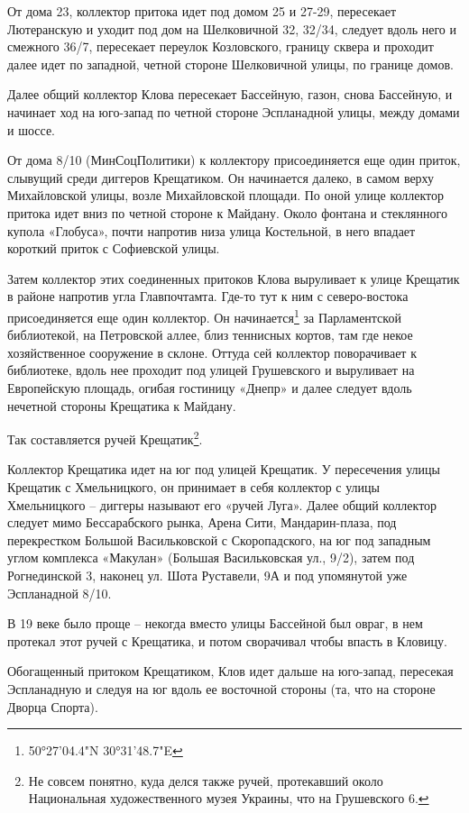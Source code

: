 От дома 23, коллектор притока идет под домом 25 и 27-29, пересекает Лютеранскую и уходит под дом на Шелковичной 32, 32/34, следует вдоль него и смежного 36/7, пересекает переулок Козловского, границу сквера и проходит далее идет по западной, четной стороне Шелковичной улицы, по границе домов.

Далее общий коллектор Клова пересекает Бассейную, газон, снова Бассейную, и начинает ход на юго-запад по четной стороне Эспланадной улицы, между домами и шоссе.

От дома 8/10 (МинСоцПолитики) к коллектору присоединяется еще один приток, слывущий среди диггеров Крещатиком. Он начинается далеко, в самом верху Михайловской улицы, возле Михайловской площади. По оной улице коллектор притока идет вниз по четной стороне к Майдану. Около фонтана и стеклянного купола «Глобуса», почти напротив низа улица Костельной, в него впадает короткий приток с Софиевской улицы.

Затем коллектор этих соединенных притоков Клова выруливает к улице Крещатик в районе напротив угла Главпочтамта. Где-то тут к ним с северо-востока присоединяется еще один коллектор. Он начинается\footnote{50°27'04.4"N 30°31'48.7"E} за Парламентской библиотекой, на Петровской аллее, близ теннисных кортов, там где некое хозяйственное сооружение в склоне. Оттуда сей коллектор поворачивает к библиотеке, вдоль нее проходит под улицей Грушевского и выруливает на Европейскую площадь, огибая гостиницу «Днепр» и далее следует вдоль нечетной стороны Крещатика к Майдану.

Так составляется ручей Крещатик\footnote{Не совсем понятно, куда делся также ручей, протекавший около Национальная художественного музея Украины, что на Грушевского 6.}. 

Коллектор Крещатика идет на юг под улицей Крещатик. У пересечения улицы Крещатик с Хмельницкого, он принимает в себя коллектор с улицы Хмельницкого – диггеры называют его «ручей Луга». Далее общий коллектор следует мимо Бессарабского рынка, Арена Сити, Мандар\-ин-плаза, под перекрестком Большой Васильковской с Скоропадского, на юг под западным углом комплекса «Макулан» (Большая Васильковская ул., 9/2), затем под Рогнединской 3, наконец ул. Шота Руставели, 9А и под упомянутой уже Эспланадной 8/10.

В 19 веке было проще – некогда вместо улицы Бассейной был овраг, в нем протекал этот ручей с Крещатика, и потом сворачивал чтобы впасть в Кловицу.

Обогащенный притоком Крещатиком, Клов идет дальше на юго-запад, пересекая Эспланадную и следуя на юг вдоль ее восточной стороны (та, что на стороне Дворца Спорта).

